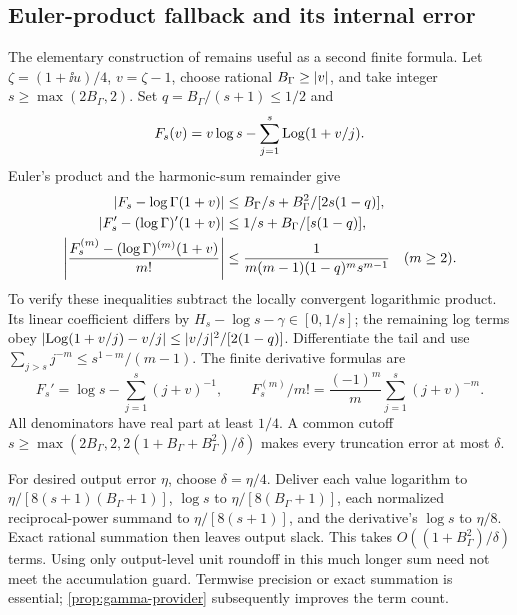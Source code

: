 \subsection{Euler-product fallback and its internal error}
\label{app:euler-provider}
The elementary construction of \cite{rec09} remains useful as a second
finite formula. Let \(\zeta=(1+\ii u)/4\), \(v=\zeta-1\),
choose rational \(B_\Gamma\ge\lvert v\rvert\), and take integer
\(s\ge\max(2B_\Gamma,2)\). Set \(q=B_\Gamma/(s+1)\le1/2\) and
\[
 F_s(v)=v\log s-\sum_{j=1}^s\operatorname{Log}(1+v/j).
\]
Euler's product \cite{dlmfgammaproduct} and the harmonic-sum remainder
give
\begin{align}
 \lvert F_s-\log\Gamma(1+v)\rvert
   &\le B_\Gamma/s+B_\Gamma^2/[2s(1-q)],\nonumber\\
 \lvert F_s'-(\log\Gamma)'(1+v)\rvert
   &\le1/s+B_\Gamma/[s(1-q)],\nonumber\\
 \left|\frac{F_s^{(m)}-(\log\Gamma)^{(m)}(1+v)}{m!}\right|
   &\le\frac1{m(m-1)(1-q)^m s^{m-1}}\quad(m\ge2).
 \label{eq:euler-fallback-tails}
\end{align}
To verify these inequalities subtract the locally convergent logarithmic
product. Its linear coefficient differs by
\(H_s-\log s-\gamma\in[0,1/s]\); the remaining log terms obey
\(\lvert \operatorname{Log}(1+v/j)-v/j\rvert\le\lvert v/j\rvert^2/[2(1-q)]\).
Differentiate the tail and use
\(\sum_{j>s}j^{-m}\le s^{1-m}/(m-1)\).
The finite derivative formulas are
\[
 F_s'=\log s-\sum_{j=1}^s(j+v)^{-1},\qquad
 F_s^{(m)}/m!=\frac{(-1)^m}{m}\sum_{j=1}^s(j+v)^{-m}.
\]
All denominators have real part at least \(1/4\).
A common cutoff
\(s\ge\max(2B_\Gamma,2,2(1+B_\Gamma+B_\Gamma^2)/\delta)\)
makes every truncation error at most \(\delta\).

For desired output error \(\eta\), choose \(\delta=\eta/4\).
Deliver each value logarithm to
\(\eta/[8(s+1)(B_\Gamma+1)]\), \(\log s\) to
\(\eta/[8(B_\Gamma+1)]\), each normalized reciprocal-power summand
to \(\eta/[8(s+1)]\), and the derivative's \(\log s\) to
\(\eta/8\). Exact rational summation then leaves output slack.
This takes \(O((1+B_\Gamma^2)/\delta)\) terms. Using only
output-level unit roundoff in this much longer sum need not meet the
accumulation guard. Termwise precision or exact summation is essential;
\cref{prop:gamma-provider} subsequently improves the term count.

